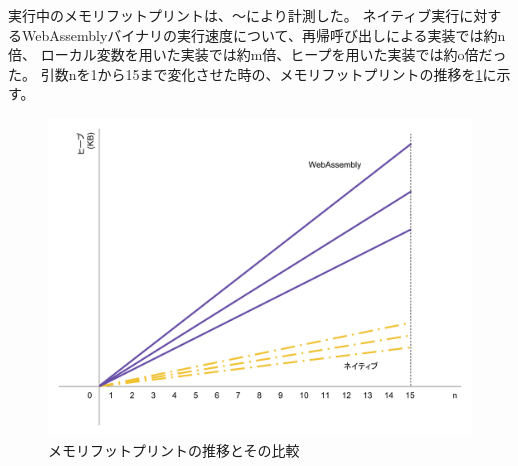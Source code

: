 実行中のメモリフットプリントは、〜により計測した。
ネイティブ実行に対するWebAssemblyバイナリの実行速度について、再帰呼び出しによる実装では約n倍、
ローカル変数を用いた実装では約m倍、ヒープを用いた実装では約o倍だった。
引数nを1から15まで変化させた時の、メモリフットプリントの推移を\ref{fig:heap_size}に示す。

\begin{figure}[htbp]
  \caption{メモリフットプリントの推移とその比較}
  \label{fig:heap_size}
  \begin{center}
    \includegraphics[bb=0 0 800 600,width=12cm]{img/heap_size.pdf}
  \end{center}
\end{figure}
